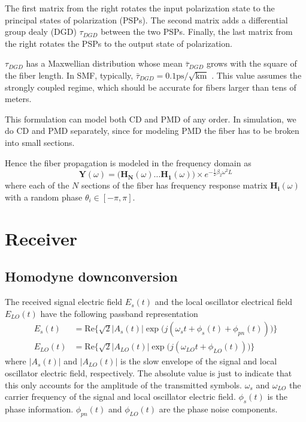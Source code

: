 \documentclass[a4paper]{article}
\begin{document}
The first matrix from the right rotates the input polarization state to the principal states of polarization (PSPs). The second matrix adds a differential group dealy (DGD) $\tau_{DGD}$ between the two PSPs. Finally, the last matrix from the right rotates the PSPs to the output state of polarization.

$\tau_{DGD}$ has a Maxwellian distribution whose mean $\bar{\tau}_{DGD}$ grows with the square of the fiber length. In SMF, typically, $\bar{\tau}_{DGD} = 0.1 \mathrm{ps/\sqrt{km}}$ \cite{Ip2008}. This value assumes the strongly coupled regime, which should be accurate for fibers larger than tens of meters.

This formulation can model both CD and PMD of any order. In simulation, we do CD and PMD separately, since for modeling PMD the fiber has to be broken into small sections.

Hence the fiber propagation is modeled in the frequency domain as
\begin{equation}
\bm{Y}(\omega) = \Big(\bm{H_N}(\omega)\ldots \bm{H_1}(\omega)\Big)\times e^{-\frac{1}{2}\beta_2\omega^2L}
\end{equation}
where each of the $N$ sections of the fiber has frequency response matrix $\bm{H_i}(\omega)$ with a random phase $\theta_i \in [-\pi, \pi]$.
\section{Receiver}
\subsection{Homodyne downconversion}
The received signal electric field $E_s(t)$ and the local oscillator electrical field $E_{LO}(t)$ have the following passband representation
\begin{align}
E_s(t) &= \mathrm{Re}\Big\{\sqrt{2}|A_s(t)|\exp\Big(j(\omega_st + \phi_s(t) + \phi_{pn}(t))\Big)\Big\} \\
E_{LO}(t) &= \mathrm{Re}\Big\{\sqrt{2}|A_{LO}(t)|\exp\Big(j(\omega_{LO}t + \phi_{LO}(t))\Big)\Big\}
\end{align}
where $|A_s(t)|$ and $|A_{LO}(t)|$ is the slow envelope of the signal and local oscillator electric field, respectively. The absolute value is just to indicate that this only accounts for the amplitude of the transmitted symbols. $\omega_s$ and $\omega_{LO}$ the carrier frequency of the signal and local oscillator electric field. $\phi_s(t)$ is the phase information. $\phi_{pn}(t)$ and $\phi_{LO}(t)$ are the phase noise components.
\end{document}
